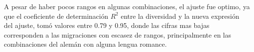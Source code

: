 A pesar de haber pocos rangos en algunas combinaciones, el ajuste fue optimo, ya que el coeficiente de determinación $R^{2}$ entre la diversidad y la nueva expresión del ajuste, tomó valores entre 0.79 y 0.95, donde  las cifras mas bajas corresponden a las migraciones con escasez de rangos, principalmente en las combinaciones del alemán con alguna lengua romance.  


